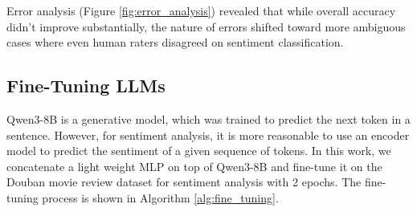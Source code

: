 \documentclass{article}
\begin{document}
Error analysis (Figure \ref{fig:error_analysis}) revealed that while overall accuracy didn't improve 
substantially, the nature of errors shifted toward more ambiguous cases where even human raters disagreed 
on sentiment classification.

\subsection{Fine-Tuning LLMs}
\label{ssec:fine_tuning}
Qwen3-8B is a generative model, which was trained to predict the next token in a sentence. However, for sentiment
analysis, it is more reasonable to use an encoder model to predict the sentiment of a given sequence of tokens.
In this work, we concatenate a light weight MLP on top of Qwen3-8B and fine-tune it on the 
Douban movie review dataset for sentiment analysis with 2 epochs. The fine-tuning process is shown in 
Algorithm \ref{alg:fine_tuning}.
\end{document}
